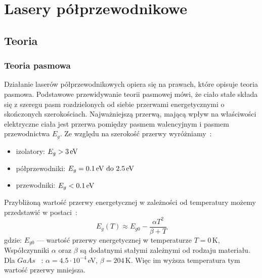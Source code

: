 \chapter{Lasery półprzewodnikowe}
\section{Teoria}
\subsection{Teoria pasmowa}
Działanie laserów półprzewodnikowych opiera się na prawach, które opisuje teoria pasmowa.
Podstawowe przewidywanie teorii pasmowej mówi, że ciało stałe składa się z szeregu pasm rozdzielonych od siebie
przerwami energetycznymi o skończonych szerokościach. Najważniejszą przerwą, mającą wpływ na właściwości elektryczne ciała jest
przerwa pomiędzy pasmem walencyjnym i pasmem przewodnictwa $E_g$. Ze względu na szerokość przerwy
wyróżniamy~\cite{laser_book}:
\begin{itemize}
\item izolatory: $E_g > 3 \text{\,eV}$
\item półprzewodniki: $E_g = 0.1 \text{\,eV do } 2.5\text{\,eV} $
\item przewodniki: $E_g<0.1\text{\,eV}$
\end{itemize}

Przybliżoną wartość przerwy energetycznej w zależności od temperatury możemy przedstawić w postaci~\cite{laser_book}:
\begin{equation}
E_g(T) \approx E_{g0} - \frac{\alpha T^2}{\beta + T}
\end{equation}
gdzie: $E_{g0}$ --- wartość przerwy energetycznej w temperaturze $T=0$\,K,
Współczynniki $\alpha$ oraz $\beta$ są dodatnymi stałymi zależnymi od rodzaju materiału.
Dla $GaAs$ ~\cite{laser_book}: $\alpha = 4.5 \cdot 10^{-4}$\,eV, $\beta = 204$\,K.
Więc im wyższa temperatura tym wartość przerwy mniejsza.
